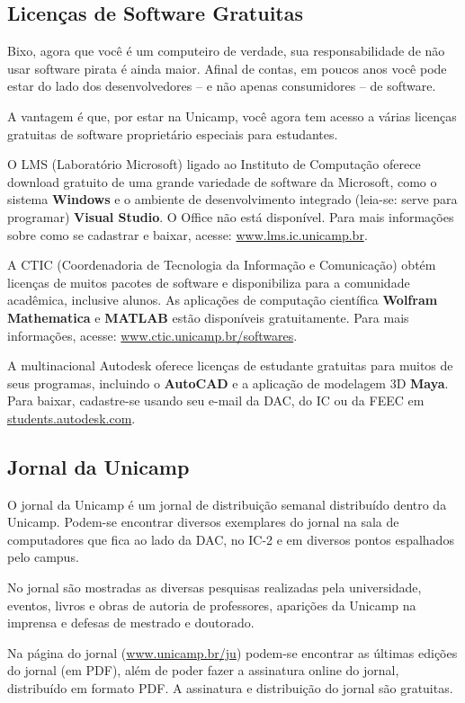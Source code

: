 \subsection{Licenças de Software Gratuitas}

Bixo, agora que você é um computeiro de verdade, sua responsabilidade de não
usar software pirata é ainda maior. Afinal de contas, em poucos anos você pode
estar do lado dos desenvolvedores -- e não apenas consumidores -- de software.

A vantagem é que, por estar na Unicamp, você agora tem acesso a várias licenças
gratuitas de software proprietário especiais para estudantes.

O LMS (Laboratório Microsoft) ligado ao Instituto de Computação oferece download
gratuito de uma grande variedade de software da Microsoft, como o sistema
\textbf{Windows} e o ambiente de desenvolvimento integrado (leia-se: serve para
programar) \textbf{Visual Studio}. O Office não está disponível. Para mais
informações sobre como se cadastrar e baixar, acesse:
\url{www.lms.ic.unicamp.br}.

A CTIC (Coordenadoria de Tecnologia da Informação e Comunicação) obtém licenças
de muitos pacotes de software e disponibiliza para a comunidade acadêmica,
inclusive alunos. As aplicações de computação científica \textbf{Wolfram
Mathematica} e \textbf{MATLAB} estão disponíveis gratuitamente. Para mais
informações, acesse: \url{www.ctic.unicamp.br/softwares}.

A multinacional Autodesk oferece licenças de estudante gratuitas para muitos de
seus programas, incluindo o \textbf{AutoCAD} e a aplicação de modelagem 3D
\textbf{Maya}. Para baixar, cadastre-se usando seu e-mail da DAC, do IC ou da
FEEC em \url{students.autodesk.com}.

\subsection{Jornal da Unicamp}

O jornal da Unicamp é um jornal de distribuição semanal distribuído dentro da
Unicamp. Podem-se encontrar diversos exemplares do jornal na sala de
computadores que fica ao lado da DAC, no IC-2 e em diversos pontos espalhados
pelo campus.

No jornal são mostradas as diversas pesquisas realizadas pela universidade,
eventos, livros e obras de autoria de professores, aparições da Unicamp na
imprensa e defesas de mestrado e doutorado.

Na página do jornal (\url{www.unicamp.br/ju}) podem-se encontrar as últimas
edições do jornal (em PDF), além de poder fazer a assinatura online do jornal,
distribuído em formato PDF. A assinatura e distribuição do jornal são gratuitas.
